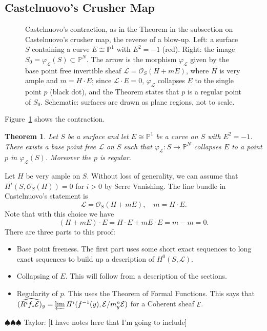 \documentclass[12pt]{article}
\numberwithin{equation}{section}
\newtheorem{theorem}{Theorem}[subsection]
\theoremstyle{definition}
\theoremstyle{remark}
\newcommand{\Ocal}{\mathcal{O}}
\newcommand{\PP}{\mathbb{P}}
\newcommand{\Lcal}{\mathcal{L}}
\newcommand{\Ecal}{\mathcal{E}}
\newcommand{\taylor}[1]{{\color{blue} \sf $\spadesuit\spadesuit\spadesuit$ Taylor: [#1]}}
\begin{document}
\subsection{Castelnuovo's Crusher Map}
\begin{figure}[H]
\centering

\caption{Castelnuovo's contraction, as in the Theorem in the subsection on Castelnuovo's crusher map, the reverse of a blow-up. Left: a surface $S$ containing a curve $E\cong\PP^1$ with $E^2=-1$ (red). Right: the image $S_0=\varphi_{\Lcal}(S)\subset\PP^N$. The arrow is the morphism $\varphi_{\Lcal}$ given by the base point free invertible sheaf $\Lcal=\Ocal_S(H+mE)$, where $H$ is very ample and $m=H\cdot E$; since $\Lcal\cdot E=0$, $\varphi_{\Lcal}$ collapses $E$ to the single point $p$ (black dot), and the Theorem states that $p$ is a regular point of $S_0$. Schematic: surfaces are drawn as plane regions, not to scale.}\label{fig:castelnuovo-contraction}
\end{figure}
Figure~\ref{fig:castelnuovo-contraction} shows the contraction.


\begin{theorem}
	Let $S$ be a surface and let $E\cong\PP^1$ be a curve on $S$ with $E^2=-1$. 
	There exists a base point free $\Lcal$ on $S$ such that $\varphi_{\Lcal}:S \to \PP^N$ collapses $E$ to a point $p$ in $\varphi_{\Lcal}(S)$.
	Moreover the $p$ is regular.
\end{theorem}
Let $H$ be very ample on $S$.
Without loss of generality, we can assume that $H^i(S,\Ocal_S(H))=0$ for $i>0$ by Serre Vanishing. 
The line bundle in Castelnuovo's statement is 
$$ \Lcal = \Ocal_S(H+mE), \quad m = H\cdot E.$$
Note that with this choice we have 
$$ (H+mE) \cdot E = H\cdot E + m E\cdot E = m-m=0. $$
There are three parts to this proof:
\begin{itemize}
	\item Base point freeness. The first part uses some short exact sequences to long exact sequences to build up a description of $H^0(S,\Lcal)$. 
	\item Collapsing of $E$. This will follow from a description of the sections. 
	\item Regularity of $p$.  This uses the Theorem of Formal Functions. This says that $\widehat{(R^if_*\Ecal)_y} = \varprojlim H^i( f^{-1}(y), \Ecal/m_y^n\Ecal )$ for a Coherent sheaf $\Ecal$.
\end{itemize}

\taylor{I have notes here that I'm going to include}
\end{document}
